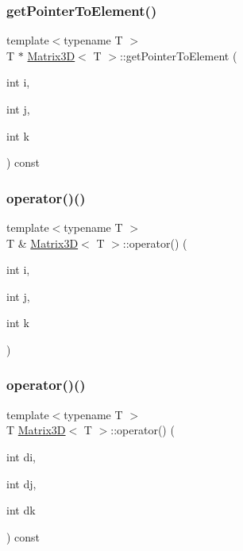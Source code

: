 \subsubsection{\texorpdfstring{get\+Pointer\+To\+Element()}{getPointerToElement()}}
{\footnotesize\ttfamily template$<$typename T $>$ \\
T $\ast$ \mbox{\hyperlink{classMatrix3D}{Matrix3D}}$<$ T $>$\+::get\+Pointer\+To\+Element (\begin{DoxyParamCaption}\item[{int}]{i,  }\item[{int}]{j,  }\item[{int}]{k }\end{DoxyParamCaption}) const}

\mbox{\label{classMatrix3D_a56e772adacd4ccf54388e6c90e3d1269}} 
\subsubsection{\texorpdfstring{operator()()}{operator()()}\hspace{0.1cm}{\footnotesize\ttfamily [1/2]}}
{\footnotesize\ttfamily template$<$typename T $>$ \\
T \& \mbox{\hyperlink{classMatrix3D}{Matrix3D}}$<$ T $>$\+::operator() (\begin{DoxyParamCaption}\item[{int}]{i,  }\item[{int}]{j,  }\item[{int}]{k }\end{DoxyParamCaption})}

\mbox{\label{classMatrix3D_a600c100c8204bbc8f2e4ebefa55cab82}} 
\subsubsection{\texorpdfstring{operator()()}{operator()()}\hspace{0.1cm}{\footnotesize\ttfamily [2/2]}}
{\footnotesize\ttfamily template$<$typename T $>$ \\
T \mbox{\hyperlink{classMatrix3D}{Matrix3D}}$<$ T $>$\+::operator() (\begin{DoxyParamCaption}\item[{int}]{di,  }\item[{int}]{dj,  }\item[{int}]{dk }\end{DoxyParamCaption}) const}

